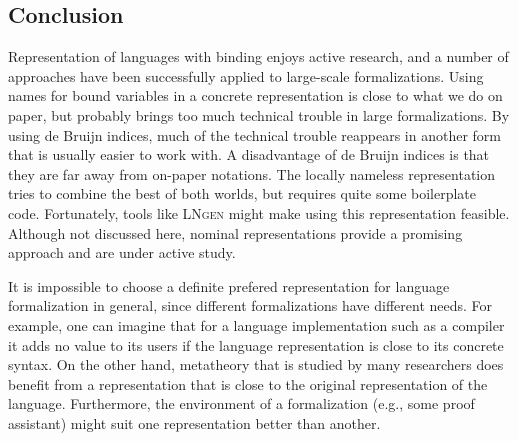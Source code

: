 \documentclass[a4paper,11pt]{article}
\newcommand{\name}[1]{\textsc{#1}\xspace}
\def\LNgen{\name{LNgen}}
\begin{document}


\subsection{Conclusion}

Representation of languages with binding enjoys active research, and a
number of approaches have been successfully applied to large-scale
formalizations.
Using names for bound variables in a concrete representation is close
to what we do on paper, but probably brings too much technical
trouble in large formalizations.
By using de Bruijn indices, much of the technical trouble reappears
in another form that is usually easier to work with.
A disadvantage of de Bruijn indices is that they are far away from
on-paper notations.
The locally nameless representation tries to combine the best of both
worlds, but requires quite some boilerplate code. Fortunately, tools
like \LNgen might make using this representation feasible. Although
not discussed here, nominal representations provide a promising
approach and are under active study.

It is impossible to choose a definite prefered representation for
language formalization in general, since different formalizations have
different needs. For example, one can imagine that for a language
implementation such as a compiler it adds no value to its users if the
language representation is close to its concrete syntax. On the other
hand, metatheory that is studied by many researchers does benefit from
a representation that is close to the original representation of the
language. Furthermore, the environment of a formalization (e.g., some
proof assistant) might suit one representation better than another.


\nocite{*} %


\end{document}
